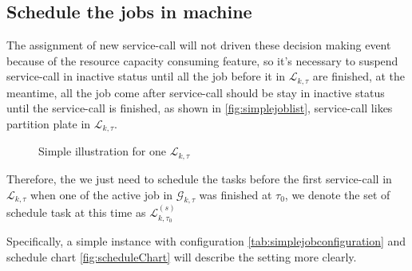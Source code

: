 \subsection{Schedule the jobs in machine} %
\label{sub:schedule_the_jobs_in_machine}

The assignment of new service-call will not driven these decision making event because of the resource capacity consuming feature, so it's necessary to suspend service-call in inactive status until all the job before it in $\mathcal{L}_{k,\tau}$ are finished, at the meantime, all the job come after service-call should be stay in inactive status until the service-call is finished, as shown in \autoref{fig:simplejoblist}, service-call likes partition plate in $\mathcal{L}_{k,\tau}$.  
\begin{figure}[htbp]
	\centering
	\resizebox{.75\textwidth}{!}{}
	\caption{Simple illustration for one $\mathcal{L}_{k,\tau}$}
	\label{fig:simplejoblist}
\end{figure}
Therefore, the we just need to schedule the tasks before the first service-call in $\mathcal{L}_{k,\tau}$ when one of the active job in $\mathcal{G}_{k,\tau}$ was finished at $\tau_0$, we denote the set of schedule task at this time as $\mathcal{L}^{(s)}_{k,\tau_0}$

Specifically, a simple instance with configuration \autoref{tab:simplejobconfiguration} and schedule chart \autoref{fig:scheduleChart} will describe the setting more clearly.

